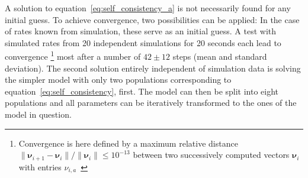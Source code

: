 A solution to equation~\eqref{eq:self_consistency_a} is not necessarily found for any initial guess. 
To achieve convergence, two possibilities 
can be applied: In the case of rates known from simulation, these serve as an initial guess. 
A test with simulated rates from 20 independent simulations for 20 seconds each lead to convergence%
\footnote{
    Convergence is here defined by a maximum relative distance 
    $\|\boldsymbol\nu_{i + 1} - \boldsymbol\nu_i\| / \|\boldsymbol\nu_i\| \le 10^{-13}$ between two 
    successively computed vectors $\boldsymbol\nu_i$ with entries $\nu_{i, a}$~\cite{scipy}
}  
most after a number of $42 \pm 12$ steps (mean and standard deviation). 
The second solution entirely independent of simulation data is solving the simpler model 
with only two populations corresponding to equation~\eqref{eq:self_consistency}, first.
The model can then be split 
into eight populations and all parameters can be iteratively transformed to the ones of the 
model in question. 

\FloatBarrier
